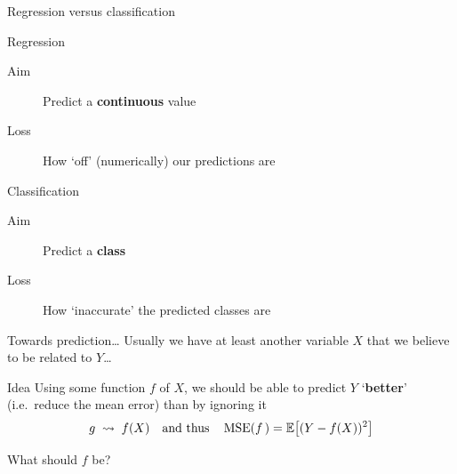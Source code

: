 \begin{frame}{Regression versus classification}
    \begin{block}{Regression}
        \begin{description}
            \item[Aim]  Predict a \textbf{continuous} value
            \item[Loss] How `off' (numerically) our predictions are
        \end{description}
    \end{block}
    \vfill
    \begin{block}{Classification}
        \begin{description}
            \item[Aim]  Predict a \textbf{class}
            \item[Loss] How `inaccurate' the predicted classes are
        \end{description}
    \end{block}
\end{frame}

\begin{frame}{Towards prediction\ldots}
    Usually we have at least another variable $X$ that we believe to be related
    to $Y$\ldots
    \vfill\pause
    \begin{block}{Idea}
        Using some function $f$ of $X$, we should be able to predict $Y$
        `\textbf{better}' (i.e.\ reduce the mean error) than by ignoring it
        \vfill
        \[
            g
            \;
            \leadsto
            \;
            f(X)
            \quad
            \text{and thus}
            \quad
            \operatorname{MSE}(f\,) = \mathbb{E}\!\left[ (Y - f(X))^{2} \right]
        \]
    \end{block}
\end{frame}

\begin{frame}[t]{What should $f$ be?}
\end{frame}

